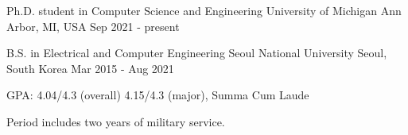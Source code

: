 

\begin{cventries}

  \cventry
    {Ph.D. student in Computer Science and Engineering}
    {University of Michigan} %
    {Ann Arbor, MI, USA} %
    {Sep 2021 - present} %
    {
    }

  \vspace{-5mm}
    
  \cventry
    {B.S. in Electrical and Computer Engineering}
    {Seoul National University} %
    {Seoul, South Korea} %
    {Mar 2015 - Aug 2021} %
    {
      \begin{cvitems} %
        \item {GPA: 4.04/4.3 (overall) 4.15/4.3 (major), Summa Cum Laude}
        \item {Period includes two years of military service.}
      \end{cvitems}
    }
    
\end{cventries}

